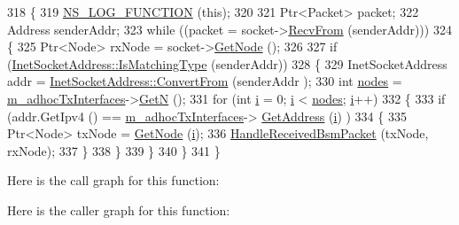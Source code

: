 \begin{DoxyCode}
318 \{
319   \hyperlink{log-macros-disabled_8h_a90b90d5bad1f39cb1b64923ea94c0761}{NS\_LOG\_FUNCTION} (\textcolor{keyword}{this});
320 
321   Ptr<Packet> packet;
322   Address senderAddr;
323   \textcolor{keywordflow}{while} ((packet = socket->\hyperlink{classns3_1_1Socket_af22378d7af9a2745a9eada20210da215}{RecvFrom} (senderAddr)))
324     \{
325       Ptr<Node> rxNode = socket->\hyperlink{classns3_1_1Socket_aba642ad4301c1df47befc0aa9afa2e48}{GetNode} ();
326 
327       \textcolor{keywordflow}{if} (\hyperlink{classns3_1_1InetSocketAddress_a9426766e34e928ce5dbdbeb9563a10df}{InetSocketAddress::IsMatchingType} (senderAddr))
328         \{
329           InetSocketAddress addr = \hyperlink{classns3_1_1InetSocketAddress_ade776b1109e7b9a7be0b22ced49931e3}{InetSocketAddress::ConvertFrom} (senderAddr
      );
330           \textcolor{keywordtype}{int} \hyperlink{visualizer-ideas_8txt_a3e1b3808014a2c68ab0cd0182e041be2}{nodes} = \hyperlink{classns3_1_1BsmApplication_a0eecb4df76f2dd46564c5f0b14260e3b}{m\_adhocTxInterfaces}->\hyperlink{classns3_1_1Ipv4InterfaceContainer_a8d565289d84cd90ef806d0f86e6235f9}{GetN} ();
331           \textcolor{keywordflow}{for} (\textcolor{keywordtype}{int} \hyperlink{bernuolliDistribution_8m_a6f6ccfcf58b31cb6412107d9d5281426}{i} = 0; \hyperlink{bernuolliDistribution_8m_a6f6ccfcf58b31cb6412107d9d5281426}{i} < \hyperlink{visualizer-ideas_8txt_a3e1b3808014a2c68ab0cd0182e041be2}{nodes}; \hyperlink{bernuolliDistribution_8m_a6f6ccfcf58b31cb6412107d9d5281426}{i}++)
332             \{
333               \textcolor{keywordflow}{if} (addr.GetIpv4 () == \hyperlink{classns3_1_1BsmApplication_a0eecb4df76f2dd46564c5f0b14260e3b}{m\_adhocTxInterfaces}->
      \hyperlink{classns3_1_1Ipv4InterfaceContainer_ae63208dcd222be986822937ee4aa828c}{GetAddress} (\hyperlink{bernuolliDistribution_8m_a6f6ccfcf58b31cb6412107d9d5281426}{i}) )
334                 \{
335                   Ptr<Node> txNode = \hyperlink{classns3_1_1Application_a664b15088389bec8e35b35742138f097}{GetNode} (\hyperlink{bernuolliDistribution_8m_a6f6ccfcf58b31cb6412107d9d5281426}{i});
336                   \hyperlink{classns3_1_1BsmApplication_ac70236a81b0967274fd55884f4935741}{HandleReceivedBsmPacket} (txNode, rxNode);
337                 \}
338             \}
339         \}
340     \}
341 \}
\end{DoxyCode}


Here is the call graph for this function\+:




Here is the caller graph for this function\+:


